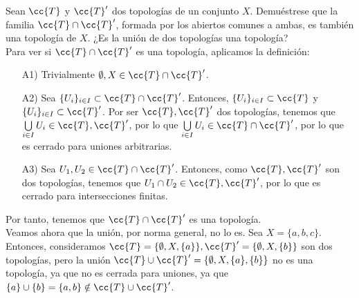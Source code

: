\begin{ejercicio}
    Sean $\cc{T}$ y $\cc{T}'$ dos topologías de un conjunto $X$. Demuéstrese que la familia $\cc{T}\cap \cc{T}'$, formada por los abiertos comunes a ambas, es también una topología de $X$. ¿Es la unión de dos topologías una topología?\\

    Para ver si $\cc{T}\cap \cc{T}'$ es una topología, aplicamos la definición:
    \begin{enumerate}
        \item[A1)] Trivialmente $\emptyset, X\in \cc{T}\cap \cc{T}'$.

        \item[A2)] Sea $\{U_i\}_{i\in I} \subset \cc{T}\cap \cc{T}'$. Entonces, $\{U_i\}_{i\in I} \subset \cc{T}$ y $\{U_i\}_{i\in I} \subset \cc{T}'$. Por ser $\cc{T},\cc{T}'$ dos topologías, tenemos que $\bigcup\limits_{i\in I}U_i\in \cc{T},\cc{T}'$, por lo que $\bigcup\limits_{i\in I}U_i\in \cc{T}\cap \cc{T}'$, por lo que es cerrado para uniones arbitrarias.

        \item[A3)] Sea $U_1,U_2\in \cc{T}\cap \cc{T}'$. Entonces, como $\cc{T},\cc{T}'$ son dos topologías, tenemos que $U_1\cap U_2\in \cc{T},\cc{T}'$, por lo que es cerrado para intersecciones finitas.
    \end{enumerate}
    Por tanto, tenemos que $\cc{T}\cap \cc{T}'$ es una topología.\\

    Veamos ahora que la unión, por norma general, no lo es. Sea $X=\{a,b,c\}$. Entonces, consideramos $\cc{T}=\{\emptyset,X,\{a\}\}, \cc{T}'=\{\emptyset,X,\{b\}\}$ son dos topologías, pero la unión $\cc{T}\cup \cc{T}'=\{\emptyset,X,\{a\},\{b\}\}$ no es una topología, ya que no es cerrada para uniones, ya que $\{a\}\cup \{b\}=\{a,b\}\notin \cc{T}\cup \cc{T}'$.
\end{ejercicio}



